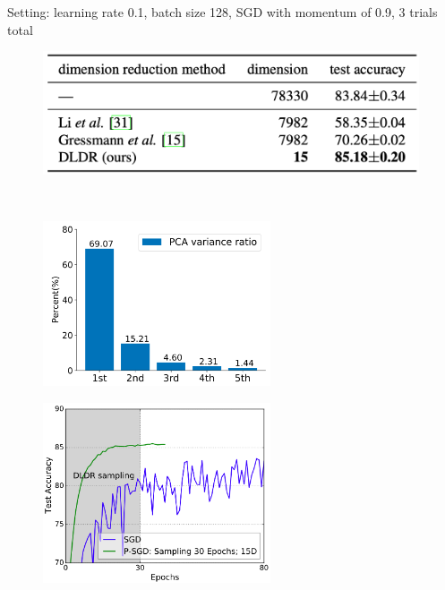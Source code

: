 \documentclass[t]{beamer}
\begin{document}
\begin{frame}
Setting: learning rate 0.1, batch size 128, SGD with momentum of 0.9, 3 trials total \vspace{0,5cm}
\begin{figure}
\includegraphics[width=0.99\textwidth]{p-sgd-1}
\end{figure}
 \\
\end{frame}



\begin{frame}
\begin{figure}
\includegraphics[width=0.6\textwidth]{p-sgd-2}
\end{figure}
\end{frame}



\begin{frame}
\begin{figure}
\includegraphics[width=0.6\textwidth]{p-sgd-3}
\end{figure}
\end{frame}
\end{document}
